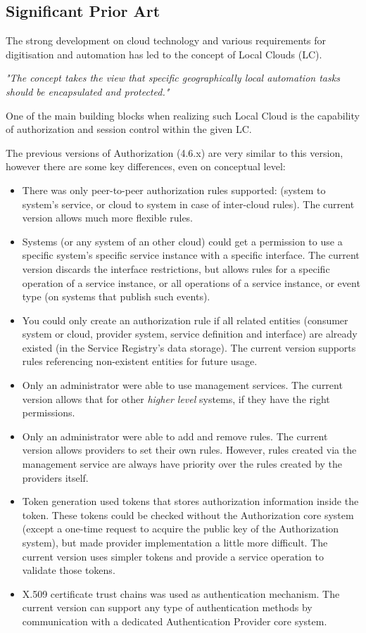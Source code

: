 \documentclass[a4paper]{arrowhead}
\begin{document}
\subsection{Significant Prior Art}
\label{sec:prior_art}

The strong development on cloud technology and various requirements for digitisation and automation has led to the concept of Local Clouds (LC).

\textit{"The concept takes the view that specific geographically local automation tasks should be encapsulated and protected."} \cite{jerker2017localclouds}

One of the main building blocks when realizing such Local Cloud is the capability of authorization and session control within the given LC.

The previous versions of Authorization (4.6.x) are very similar to this version, however there are some key differences, even on conceptual level:

\begin{itemize}
    \item There was only peer-to-peer authorization rules supported: (system to system's service, or cloud to system in case of inter-cloud rules). The current version allows much more flexible rules.
    \item Systems (or any system of an other cloud) could get a permission to use a specific system's specific service instance with a specific interface. The current version discards the interface restrictions, but allows rules for a specific operation of a service instance, or all operations of a service instance, or event type (on systems that publish such events). 
    \item You could only create an authorization rule if all related entities (consumer system or cloud, provider system, service definition and interface) are already existed (in the Service Registry's data storage). The current version supports rules referencing non-existent entities for future usage.
    \item Only an administrator were able to use management services. The current version allows that for other \textit{higher level} systems, if they have the right permissions.
    \item Only an administrator were able to add and remove rules. The current version allows providers to set their own rules. However, rules created via the management service are always have priority over the rules created by the providers itself.
    \item Token generation used tokens that stores authorization information inside the token. These tokens could be checked without the Authorization core system (except a one-time request to acquire the public key of the Authorization system), but made provider implementation a little more difficult. The current version uses simpler tokens and provide a service operation to validate those tokens. 
    \item X.509 certificate trust chains was used as authentication mechanism. The current version can support any type of authentication methods by communication with a dedicated Authentication Provider core system.
\end{itemize}
\end{document}
